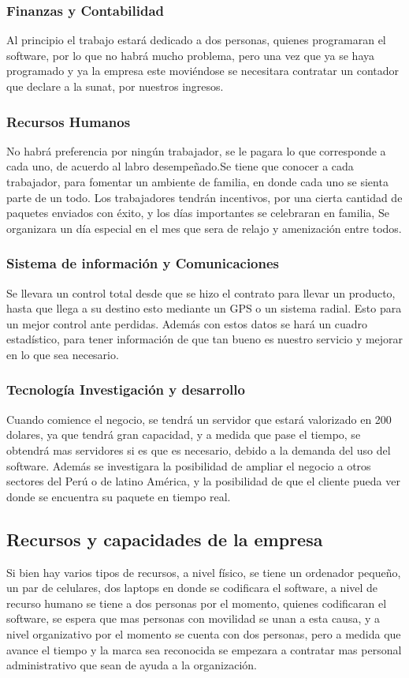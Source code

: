 \subsubsection{Finanzas y Contabilidad}
Al principio el trabajo estará dedicado a dos personas, quienes programaran el software, por lo que no habrá mucho problema, pero una vez que ya se haya programado  y ya la empresa este moviéndose se necesitara contratar un contador que declare a la sunat, por nuestros ingresos.
\subsubsection{Recursos Humanos}
No habrá preferencia por ningún trabajador, se le pagara lo que corresponde a cada uno, de acuerdo al labro desempeñado.Se tiene que conocer a cada trabajador, para fomentar un ambiente de familia, en donde cada uno se sienta parte de un todo. Los trabajadores tendrán incentivos, por una cierta cantidad de paquetes enviados con éxito, y los días importantes se celebraran en familia, Se organizara un día especial en el mes que sera de relajo y amenización entre todos. 
\subsubsection{Sistema de información y Comunicaciones}
Se llevara un control total desde que se hizo el contrato para llevar un producto, hasta que llega a su destino esto mediante un GPS o un sistema radial. Esto para un mejor control ante perdidas. Además con estos datos se hará un cuadro estadístico, para tener información de que tan bueno es nuestro servicio y mejorar en lo que sea necesario.
\subsubsection{Tecnología Investigación y desarrollo}
Cuando comience el negocio, se tendrá un servidor que estará valorizado en 200 dolares, ya que tendrá gran capacidad, y a medida que pase el tiempo, se obtendrá mas servidores si es que es necesario, debido a la demanda del uso del software. Además se investigara la posibilidad de ampliar el negocio a otros sectores del Perú o de latino América, y la posibilidad de que el cliente pueda ver donde se encuentra su paquete en tiempo real.  
\subsection{Recursos y capacidades de la empresa}
Si bien hay varios tipos de recursos, a nivel físico, se tiene un ordenador pequeño, un par de celulares, dos laptops en donde se codificara el software, a nivel de recurso humano se tiene a dos personas por el momento, quienes codificaran el software, se espera que mas personas con movilidad se unan a esta causa, y a nivel organizativo por el momento se cuenta con dos personas, pero a medida que avance el tiempo y la marca sea reconocida se empezara a contratar mas personal administrativo que sean de ayuda a la organización.
